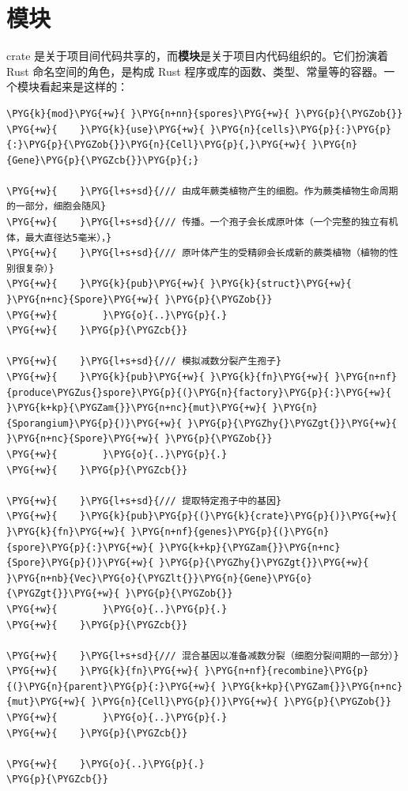 \section{模块}

crate 是关于项目间代码共享的，而\textbf{模块}是关于项目内代码组织的。它们扮演着 Rust 命名空间的角色，是构成 Rust 程序或库的函数、类型、常量等的容器。一个模块看起来是这样的：

\begin{Verbatim}[commandchars=\\\{\},breaklines=true,breakanywhere=true,fontsize=\codefont,xleftmargin=17bp]
\PYG{k}{mod}\PYG{+w}{ }\PYG{n+nn}{spores}\PYG{+w}{ }\PYG{p}{\PYGZob{}}
\PYG{+w}{    }\PYG{k}{use}\PYG{+w}{ }\PYG{n}{cells}\PYG{p}{:}\PYG{p}{:}\PYG{p}{\PYGZob{}}\PYG{n}{Cell}\PYG{p}{,}\PYG{+w}{ }\PYG{n}{Gene}\PYG{p}{\PYGZcb{}}\PYG{p}{;}

\PYG{+w}{    }\PYG{l+s+sd}{/// 由成年蕨类植物产生的细胞。作为蕨类植物生命周期的一部分，细胞会随风}
\PYG{+w}{    }\PYG{l+s+sd}{/// 传播。一个孢子会长成原叶体（一个完整的独立有机体，最大直径达5毫米），}
\PYG{+w}{    }\PYG{l+s+sd}{/// 原叶体产生的受精卵会长成新的蕨类植物（植物的性别很复杂）}
\PYG{+w}{    }\PYG{k}{pub}\PYG{+w}{ }\PYG{k}{struct}\PYG{+w}{ }\PYG{n+nc}{Spore}\PYG{+w}{ }\PYG{p}{\PYGZob{}}
\PYG{+w}{        }\PYG{o}{..}\PYG{p}{.}
\PYG{+w}{    }\PYG{p}{\PYGZcb{}}

\PYG{+w}{    }\PYG{l+s+sd}{/// 模拟减数分裂产生孢子}
\PYG{+w}{    }\PYG{k}{pub}\PYG{+w}{ }\PYG{k}{fn}\PYG{+w}{ }\PYG{n+nf}{produce\PYGZus{}spore}\PYG{p}{(}\PYG{n}{factory}\PYG{p}{:}\PYG{+w}{ }\PYG{k+kp}{\PYGZam{}}\PYG{n+nc}{mut}\PYG{+w}{ }\PYG{n}{Sporangium}\PYG{p}{)}\PYG{+w}{ }\PYG{p}{\PYGZhy{}\PYGZgt{}}\PYG{+w}{ }\PYG{n+nc}{Spore}\PYG{+w}{ }\PYG{p}{\PYGZob{}}
\PYG{+w}{        }\PYG{o}{..}\PYG{p}{.}
\PYG{+w}{    }\PYG{p}{\PYGZcb{}}

\PYG{+w}{    }\PYG{l+s+sd}{/// 提取特定孢子中的基因}
\PYG{+w}{    }\PYG{k}{pub}\PYG{p}{(}\PYG{k}{crate}\PYG{p}{)}\PYG{+w}{ }\PYG{k}{fn}\PYG{+w}{ }\PYG{n+nf}{genes}\PYG{p}{(}\PYG{n}{spore}\PYG{p}{:}\PYG{+w}{ }\PYG{k+kp}{\PYGZam{}}\PYG{n+nc}{Spore}\PYG{p}{)}\PYG{+w}{ }\PYG{p}{\PYGZhy{}\PYGZgt{}}\PYG{+w}{ }\PYG{n+nb}{Vec}\PYG{o}{\PYGZlt{}}\PYG{n}{Gene}\PYG{o}{\PYGZgt{}}\PYG{+w}{ }\PYG{p}{\PYGZob{}}
\PYG{+w}{        }\PYG{o}{..}\PYG{p}{.}
\PYG{+w}{    }\PYG{p}{\PYGZcb{}}

\PYG{+w}{    }\PYG{l+s+sd}{/// 混合基因以准备减数分裂（细胞分裂间期的一部分）}
\PYG{+w}{    }\PYG{k}{fn}\PYG{+w}{ }\PYG{n+nf}{recombine}\PYG{p}{(}\PYG{n}{parent}\PYG{p}{:}\PYG{+w}{ }\PYG{k+kp}{\PYGZam{}}\PYG{n+nc}{mut}\PYG{+w}{ }\PYG{n}{Cell}\PYG{p}{)}\PYG{+w}{ }\PYG{p}{\PYGZob{}}
\PYG{+w}{        }\PYG{o}{..}\PYG{p}{.}
\PYG{+w}{    }\PYG{p}{\PYGZcb{}}

\PYG{+w}{    }\PYG{o}{..}\PYG{p}{.}
\PYG{p}{\PYGZcb{}}
\end{Verbatim}

